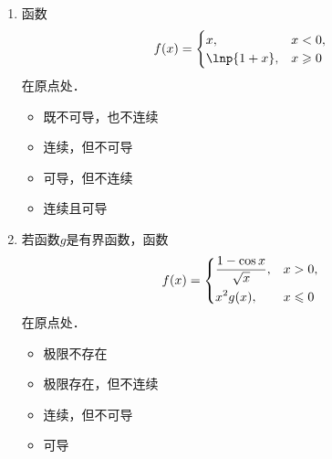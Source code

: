 \documentclass[a4paper,punct=CCT]{ctexbook}
\renewcommand*{\siand}{\shortintertext{和}}
\theoremstyle{definition}
\theoremstyle{remark}
\newif\ifshowsol
\let\leq\leqslant
\let\le\leq
\let\geq\geqslant
\let\ge\geq}
\begin{document}
\begin{enumerate}
\item 函数
  \begin{equation*}
    f(x) =
    \begin{cases}
      x, & x < 0, \\
      \lnp{1+x}, & x \ge 0
    \end{cases}
  \end{equation*}
  在原点处\uline{\hspace{8em}}．
  \begin{itemize}
    \renewcommand{\labelitemi}{\faCircleThin}
  \item 既不可导，也不连续
  \item 连续，但不可导
  \item 可导，但不连续
    \ifshowsol
  \item[\faCircle]
    \else
  \item
    \fi
    连续且可导
  \end{itemize}

\item 若函数\(g\)是有界函数，函数
  \begin{equation*}
    f(x) =
    \begin{dcases}
      \frac{1 - \cos x}{\sqrt x}, & x > 0, \\
      x^2 g(x), & x \le 0
    \end{dcases}
  \end{equation*}
  在原点处\uline{\hspace{8em}}．
  \begin{itemize}
    \renewcommand{\labelitemi}{\faCircleThin}
  \item 极限不存在
  \item 极限存在，但不连续
  \item 连续，但不可导
    \ifshowsol
  \item[\faCircle]
    \else
  \item
    \fi
    可导
  \end{itemize}

  \ifshowsol
  因为\(\,f(0) = 0\)，所以\(\,f'(0) = \!\lim\limits_{\fdx\to0} f(\fdx)/\!\fdx\)．又因为
  \begin{gather*}
    \lim_{\fdx\to0^-}\negthickspace\frac{\,f(\fdx)}{\fdx}
    = \negthickspace\lim_{\fdx\to0^-}\negthickspace\frac{\fdx^2 g(\fdx)}{\fdx}
    = \negthickspace\lim_{\fdx\to0^-}\negthickspace\fdx\,g(\fdx)
    = 0 \\
    \siand
    \lim_{\fdx\to0^+}\negthickspace\frac{\,f(\fdx)}{\fdx}
    = \negthickspace\lim_{\fdx\to0^+}\negthickspace\frac{1-\cosp\fdx}{\fdx^{1.5}}
    = \negthickspace\lim_{\fdx\to0^+}\negthickspace\frac{\!\sqrt{\scriptstyle\fdx}\,}{2}
    = 0,
  \end{gather*}
  所以\(\,f'(0) = 0\)．
  \fi


\end{enumerate}
\end{document}
